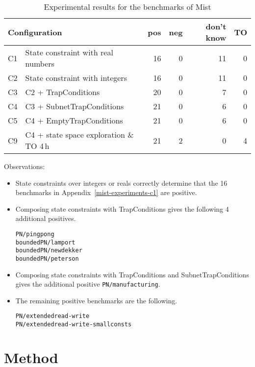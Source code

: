 \documentclass{article}
\newcommand{\mist}{{\sc Mist}}
\newcommand{\ttt}[1]{\texttt{#1}}
\begin{document}
\begin{table}[h]
\begin{center}
  \begin{tabular}{ | r | p{6cm} | r | r | r | r | }
    \hline
    \multicolumn{2}{|l|}{Configuration} & pos & neg & don't know & TO \\
    \hline
    C1 & State constraint with real numbers & 16 &  0 & 11 &  0 \\
    C2 & State constraint with integers     & 16 &  0 & 11 &  0 \\
    \hline
    C3 & C2 + TrapConditions               & 20 &  0 &  7 &  0 \\
    C4 & C3 + SubnetTrapConditions         & 21 &  0 &  6 &  0 \\
    C5 & C4 + EmptyTrapConditions          & 21 &  0 &  6 &  0 \\
    \hline
    C9 & C4 + state space exploration \& TO 4\,h & 21 &  2 & 0 &  4 \\
    \hline
  \end{tabular}
\end{center}
\caption{Experimental results for the benchmarks of \mist}
\label{mist-experiments}
\end{table}

Observations:
\begin{itemize}
\item State constraints over integers or reals correctly determine that the 16 benchmarks in Appendix~\ref{mist-experiments-c1} are positive.
\item Composing state constraints with TrapConditions gives the following 4 additional positives.
\begin{verbatim}
PN/pingpong
boundedPN/lamport
boundedPN/newdekker
boundedPN/peterson
\end{verbatim}
\item Composing state constraints with TrapConditions and SubnetTrapConditions gives the additional positive \ttt{PN/manufacturing}.
  \item The remaining positive benchmarks are the following.
\begin{verbatim}
PN/extendedread-write
PN/extendedread-write-smallconsts
\end{verbatim}
\end{itemize}

\newpage

\iffalse
\section{Method}
\end{document}
